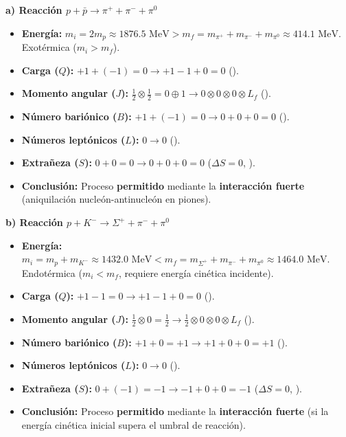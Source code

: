\begin{problema}
\textbf{a) Reacción $p + \bar{p} \to \pi^+ + \pi^- + \pi^0$}
\begin{itemize}
    \item \textbf{Energía:} $m_i = 2 m_p \approx 1876.5 \text{ MeV} > m_f = m_{\pi^+} + m_{\pi^-} + m_{\pi^0} \approx 414.1 \text{ MeV}$. Exotérmica ($m_i > m_f$).
    \item \textbf{Carga ($Q$):} $+1 + (-1) = 0 \to +1 - 1 + 0 = 0$ (\checkmark).
    \item \textbf{Momento angular ($J$):} $\frac{1}{2} \otimes \frac{1}{2} = 0 \oplus 1 \to 0 \otimes 0 \otimes 0 \otimes L_f$ (\checkmark).
    \item \textbf{Número bariónico ($B$):} $+1 + (-1) = 0 \to 0 + 0 + 0 = 0$ (\checkmark).
    \item \textbf{Números leptónicos ($L$):} $0 \to 0$ (\checkmark).
    \item \textbf{Extrañeza ($S$):} $0 + 0 = 0 \to 0 + 0 + 0 = 0$ ($\Delta S = 0$, \checkmark).
    \item \textbf{Conclusión:} Proceso \textbf{permitido} mediante la \textbf{interacción fuerte} (aniquilación nucleón-antinucleón en piones).
\end{itemize}

\textbf{b) Reacción $p + K^- \to \Sigma^+ + \pi^- + \pi^0$}
\begin{itemize}
    \item \textbf{Energía:} $m_i = m_p + m_{K^-} \approx 1432.0 \text{ MeV} < m_f = m_{\Sigma^+} + m_{\pi^-} + m_{\pi^0} \approx 1464.0 \text{ MeV}$. Endotérmica ($m_i < m_f$, requiere energía cinética incidente).
    \item \textbf{Carga ($Q$):} $+1 - 1 = 0 \to +1 - 1 + 0 = 0$ (\checkmark).
    \item \textbf{Momento angular ($J$):} $\frac{1}{2} \otimes 0 = \frac{1}{2} \to \frac{1}{2} \otimes 0 \otimes 0 \otimes L_f$ (\checkmark).
    \item \textbf{Número bariónico ($B$):} $+1 + 0 = +1 \to +1 + 0 + 0 = +1$ (\checkmark).
    \item \textbf{Números leptónicos ($L$):} $0 \to 0$ (\checkmark).
    \item \textbf{Extrañeza ($S$):} $0 + (-1) = -1 \to -1 + 0 + 0 = -1$ ($\Delta S = 0$, \checkmark).
    \item \textbf{Conclusión:} Proceso \textbf{permitido} mediante la \textbf{interacción fuerte} (si la energía cinética inicial supera el umbral de reacción).
\end{itemize}


\end{problema}
